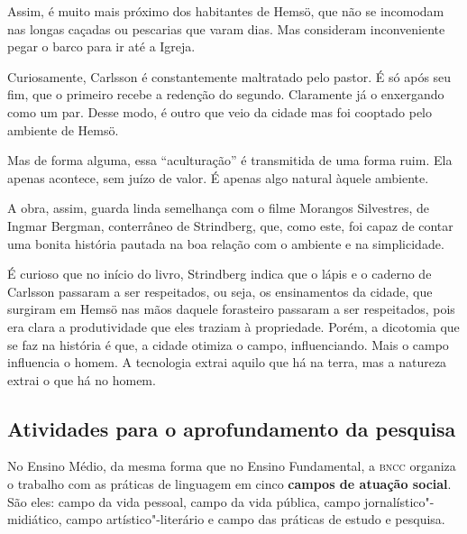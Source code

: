 \documentclass[12pt]{extarticle}
\begin{document}
Assim, é muito mais próximo dos habitantes de Hemsö, que não se
incomodam nas longas caçadas ou pescarias que varam dias. Mas consideram
inconveniente pegar o barco para ir até a Igreja.

Curiosamente, Carlsson é constantemente maltratado pelo pastor. É só
após seu fim, que o primeiro recebe a redenção do segundo. Claramente já
o enxergando como um par. Desse modo, é outro que veio da cidade mas foi
cooptado pelo ambiente de Hemsö.

Mas de forma alguma, essa ``aculturação'' é transmitida de uma forma
ruim. Ela apenas acontece, sem juízo de valor. É apenas algo natural
àquele ambiente.

A obra, assim, guarda linda semelhança com o filme Morangos Silvestres,
de Ingmar Bergman, conterrâneo de Strindberg, que, como este, foi capaz
de contar uma bonita história pautada na boa relação com o ambiente e na
simplicidade.






É curioso que no início do livro, Strindberg indica que o lápis e o
caderno de Carlsson passaram a ser respeitados, ou seja, os ensinamentos
da cidade, que surgiram em Hemsö nas mãos daquele forasteiro passaram a
ser respeitados, pois era clara a produtividade que eles traziam à
propriedade. Porém, a dicotomia que se faz na história é que, a cidade
otimiza o campo, influenciando. Mais o campo influencia o homem. A
tecnologia extrai aquilo que há na terra, mas a natureza extrai o que há
no homem.




\subsection{Atividades para o aprofundamento da pesquisa}


No Ensino Médio, da mesma forma que no Ensino Fundamental, a \textsc{bncc}
organiza o trabalho com as práticas de linguagem em cinco \textbf{campos
de atuação social}. São eles: campo da vida pessoal, campo da vida
pública, campo jornalístico"-midiático, campo artístico"-literário e campo
das práticas de estudo e pesquisa.
\end{document}
